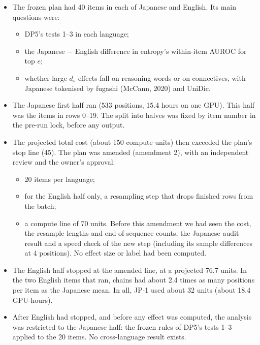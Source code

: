 \documentclass[
  10pt,
  a4paper,
]{article}
\providecommand{\tightlist}{%
  \setlength{\itemsep}{0pt}\setlength{\parskip}{0pt}}
\begin{document}
\begin{itemize}
\tightlist
\item
  The frozen plan had 40 items in each of Japanese and English. Its main questions were:

  \begin{itemize}
  \tightlist
  \item
    DP5's tests 1--3 in each language;
  \item
    the Japanese − English difference in entropy's within-item AUROC for top \(e\);
  \item
    whether large \(d_{s}\) effects fall on reasoning words or on connectives, with Japanese tokenised by fugashi (McCann, 2020) and UniDic.
  \end{itemize}
\item
  The Japanese first half ran (533 positions, 15.4 hours on one GPU). This half was the items in rows 0--19. The split into halves was fixed by item number in the pre-run lock, before any output.
\item
  The projected total cost (about 150 compute units) then exceeded the plan's stop line (45). The plan was amended (amendment 2), with an independent review and the owner's approval:

  \begin{itemize}
  \tightlist
  \item
    20 items per language;
  \item
    for the English half only, a resampling step that drops finished rows from the batch;
  \item
    a compute line of 70 units. Before this amendment we had seen the cost, the resample lengths and end-of-sequence counts, the Japanese audit result and a speed check of the new step (including its
    sample differences at 4 positions). No effect size or label had been computed.
  \end{itemize}
\item
  The English half stopped at the amended line, at a projected 76.7 units. In the two English items that ran, chains had about 2.4 times as many positions per item as the Japanese mean. In all, JP-1
  used about 32 units (about 18.4 GPU-hours).
\item
  After English had stopped, and before any effect was computed, the analysis was restricted to the Japanese half: the frozen rules of DP5's tests 1--3 applied to the 20 items. No cross-language
  result exists.
\end{itemize}
\end{document}

